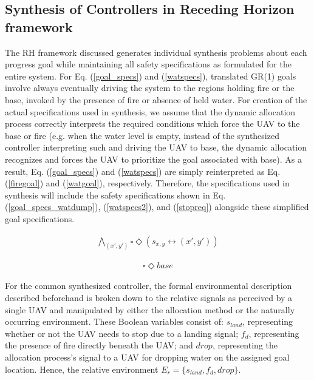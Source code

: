 \documentclass{ieeeaccess}
\newcommand{\always}{\square}
\newcommand{\eventually}{\Diamond}
\begin{document}
\subsection{Synthesis of Controllers in Receding Horizon framework}
The RH framework discussed generates individual synthesis problems about each progress goal while maintaining all safety specifications as formulated for the entire system. For Eq. (\ref{goal_specs}) and (\ref{watspecs}), translated GR(1) goals involve always eventually driving the system to the regions holding fire or the base, invoked by the presence of fire or absence of held water. For creation of the actual specifications used in synthesis, we assume that the dynamic allocation process correctly interprets the required conditions which force the UAV to the base or fire (e.g. when the water level is empty, instead of the synthesized controller interpreting such and driving the UAV to base, the dynamic allocation recognizes and forces the UAV to prioritize the goal associated with base). As a result, Eq. (\ref{goal_specs}) and (\ref{watspecs}) are simply reinterpreted as Eq. (\ref{firegoal}) and (\ref{watgoal}), respectively. Therefore, the specifications used in synthesis will include the safety specifications shown in Eq. (\ref{goal_specs_watdump}), (\ref{watspecs2}), and (\ref{stopreq}) alongside these simplified goal specifications.

\begin{equation}
\begin{aligned}
\bigwedge_{(x',y')} \always \eventually (s_{x,y} \leftrightarrow (x', y'))
\end{aligned}
\label{firegoal}
\end{equation}

\begin{equation}
\begin{aligned}
\always \eventually base
\end{aligned}
\label{watgoal}
\end{equation}

For the common synthesized controller, the formal environmental description described beforehand is broken down to the relative signals as perceived by a single UAV and manipulated by either the allocation method or the naturally occurring environment. These Boolean variables consist of: $s_{land}$, representing whether or not the UAV needs to stop due to a landing signal; $f_d$, representing the presence of fire directly beneath the UAV; and $drop$, representing the allocation process's signal to a UAV for dropping water on the assigned goal location. Hence, the relative environment $E_r = \{s_{land}, f_d, drop\}$. 
\end{document}
